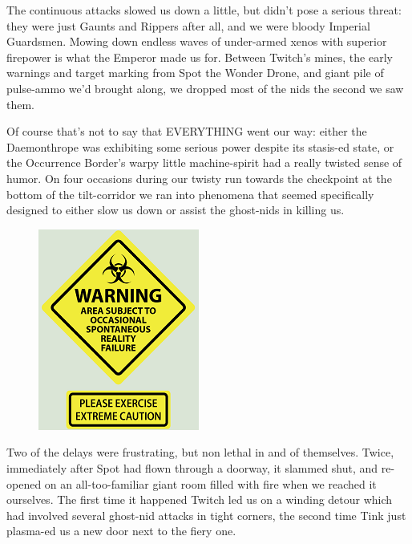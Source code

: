 The continuous attacks slowed us down a little, but didn't pose a serious threat: 
they were just Gaunts and Rippers after all, and we were bloody Imperial Guardsmen. 
Mowing down endless waves of under-armed xenos with superior firepower is what the Emperor made us for. 
Between Twitch's mines, the early warnings and target marking from Spot the Wonder Drone, and giant pile of pulse-ammo we'd brought along, we dropped most of the nids the second we saw them. 


Of course that's not to say that EVERYTHING went our way: 
either the Daemonthrope was exhibiting some serious power despite its stasis-ed state, or the Occurrence Border's warpy little machine-spirit had a really twisted sense of humor. 
On four occasions during our twisty run towards the checkpoint at the bottom of the tilt-corridor we ran into phenomena that seemed specifically designed to either slow us down or assist the ghost-nids in killing us.

\begin{figure}
	\begin{center}
		\includegraphics[width=\figwidth]{pics/15/51.png}
	\end{center}
\end{figure}
Two of the delays were frustrating, but non lethal in and of themselves. 
Twice, immediately after Spot had flown through a doorway, it slammed shut, and re-opened on an all-too-familiar giant room filled with fire when we reached it ourselves. 
The first time it happened Twitch led us on a winding detour which had involved several ghost-nid attacks in tight corners, the second time Tink just plasma-ed us a new door next to the fiery one.

